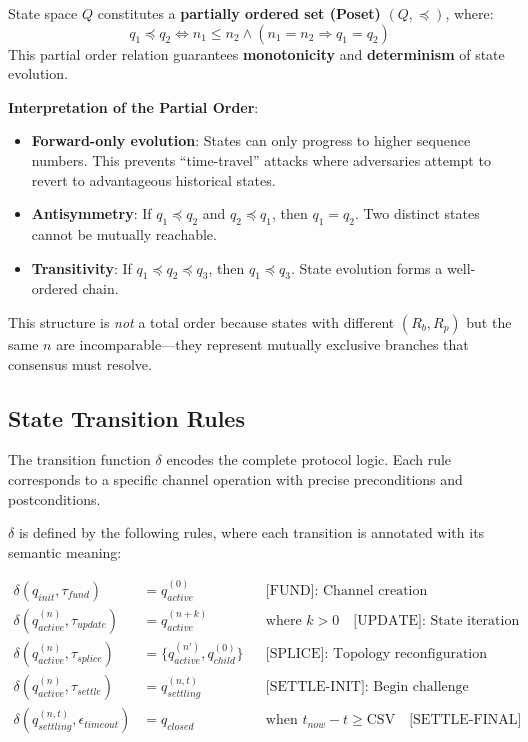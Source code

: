 \begin{definition}
State space $Q$ constitutes a \textbf{partially ordered set (Poset)} $(Q, \preceq)$, where:
$$q_1 \preceq q_2 \iff n_1 \leq n_2 \land (n_1 = n_2 \Rightarrow q_1 = q_2)$$
This partial order relation guarantees \textbf{monotonicity} and \textbf{determinism} of state evolution.
\end{definition}

\textbf{Interpretation of the Partial Order}:
\begin{itemize}
    \item \textbf{Forward-only evolution}: States can only progress to higher sequence numbers. This prevents ``time-travel'' attacks where adversaries attempt to revert to advantageous historical states.
    \item \textbf{Antisymmetry}: If $q_1 \preceq q_2$ and $q_2 \preceq q_1$, then $q_1 = q_2$. Two distinct states cannot be mutually reachable.
    \item \textbf{Transitivity}: If $q_1 \preceq q_2 \preceq q_3$, then $q_1 \preceq q_3$. State evolution forms a well-ordered chain.
\end{itemize}

This structure is \textit{not} a total order because states with different $(R_b, R_p)$ but the same $n$ are incomparable---they represent mutually exclusive branches that consensus must resolve.

\subsection{State Transition Rules}

The transition function $\delta$ encodes the complete protocol logic. Each rule corresponds to a specific channel operation with precise preconditions and postconditions.

\begin{definition}
$\delta$ is defined by the following rules, where each transition is annotated with its semantic meaning:

\begin{align*}
\delta(q_{init}, \tau_{fund}) &= q_{active}^{(0)} && \text{[FUND]: Channel creation} \\
\delta(q_{active}^{(n)}, \tau_{update}) &= q_{active}^{(n+k)} && \text{where } k > 0 \quad \text{[UPDATE]: State iteration} \\
\delta(q_{active}^{(n)}, \tau_{splice}) &= \{q_{active}^{(n')}, q_{child}^{(0)}\} && \text{[SPLICE]: Topology reconfiguration} \\
\delta(q_{active}^{(n)}, \tau_{settle}) &= q_{settling}^{(n, t)} && \text{[SETTLE-INIT]: Begin challenge period} \\
\delta(q_{settling}^{(n, t)}, \epsilon_{timeout}) &= q_{closed} && \text{when } t_{now} - t \geq \text{CSV} \quad \text{[SETTLE-FINAL]}
\end{align*}
\end{definition}

